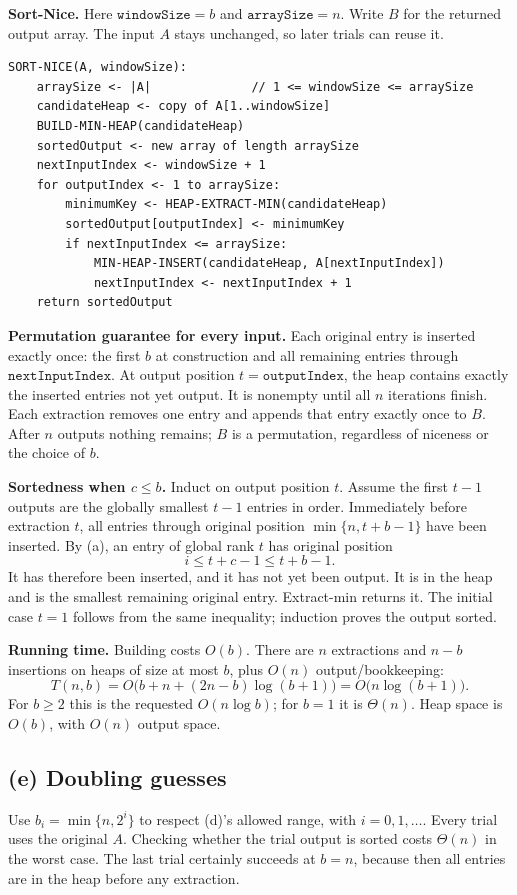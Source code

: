 \documentclass[11pt,a4paper]{article}
\newcommand{\parttitle}[1]{\Needspace{10\baselineskip}\subsection*{#1}}
\begin{document}
\textbf{Sort-Nice.} Here $\mathtt{windowSize}=b$ and $\mathtt{arraySize}=n$. Write $B$ for the returned output array. The input $A$ stays unchanged, so later trials can reuse it.
\begin{lstlisting}
SORT-NICE(A, windowSize):
    arraySize <- |A|              // 1 <= windowSize <= arraySize
    candidateHeap <- copy of A[1..windowSize]
    BUILD-MIN-HEAP(candidateHeap)
    sortedOutput <- new array of length arraySize
    nextInputIndex <- windowSize + 1
    for outputIndex <- 1 to arraySize:
        minimumKey <- HEAP-EXTRACT-MIN(candidateHeap)
        sortedOutput[outputIndex] <- minimumKey
        if nextInputIndex <= arraySize:
            MIN-HEAP-INSERT(candidateHeap, A[nextInputIndex])
            nextInputIndex <- nextInputIndex + 1
    return sortedOutput
\end{lstlisting}
\textbf{Permutation guarantee for every input.} Each original entry is inserted exactly once: the first $b$ at construction and all remaining entries through $\mathtt{nextInputIndex}$. At output position $t=\mathtt{outputIndex}$, the heap contains exactly the inserted entries not yet output. It is nonempty until all $n$ iterations finish. Each extraction removes one entry and appends that entry exactly once to $B$. After $n$ outputs nothing remains; $B$ is a permutation, regardless of niceness or the choice of $b$.

\textbf{Sortedness when $c\le b$.} Induct on output position $t$. Assume the first $t-1$ outputs are the globally smallest $t-1$ entries in order. Immediately before extraction $t$, all entries through original position $\min\{n,t+b-1\}$ have been inserted. By (a), an entry of global rank $t$ has original position
\[
i\le t+c-1\le t+b-1.
\]
It has therefore been inserted, and it has not yet been output. It is in the heap and is the smallest remaining original entry. Extract-min returns it. The initial case $t=1$ follows from the same inequality; induction proves the output sorted.

\textbf{Running time.} Building costs $O(b)$. There are $n$ extractions and $n-b$ insertions on heaps of size at most $b$, plus $O(n)$ output/bookkeeping:
\[
T(n,b)=O\bigl(b+n+(2n-b)\log(b+1)\bigr)
=\boxed{O\bigl(n\log(b+1)\bigr)}.
\]
For $b\ge2$ this is the requested $O(n\log b)$; for $b=1$ it is $\Theta(n)$.  Heap space is $O(b)$, with $O(n)$ output space.

\parttitle{(e) Doubling guesses}
Use $b_i=\min\{n,2^i\}$ to respect (d)'s allowed range, with $i=0,1,\ldots$. Every trial uses the original $A$. Checking whether the trial output is sorted costs $\Theta(n)$ in the worst case. The last trial certainly succeeds at $b=n$, because then all entries are in the heap before any extraction.
\end{document}
